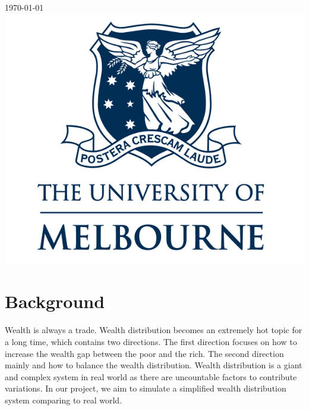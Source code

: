 \begin{titlepage}
{\large \today}\\[2cm] %


\includegraphics[scale = 0.27]{logo.png}\\[1cm] %
 

\vfill %

\end{titlepage}


\section{Background}
Wealth is always a  trade. Wealth distribution becomes an extremely hot topic for a long time, which contains two directions. The first direction focuses on how to increase the wealth gap between the poor and the rich. The second direction mainly and how to balance the wealth distribution. Wealth distribution is a giant and complex system in real world as there are uncountable factors to contribute variations. In our project, we aim to simulate a simplified wealth distribution system comparing to real world.\\

